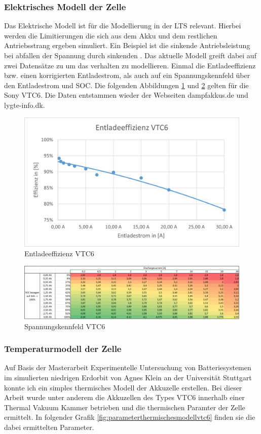 \subsubsection{Elektrisches Modell der Zelle}
Das Elektrische Modell ist für die Modellierung in der \ac{LTS} relevant. Hierbei werden die Limitierungen die sich aus dem Akku und dem restlichen Antriebsstrang ergeben simuliert. Ein Beispiel ist die sinkende Antriebsleistung bei abfallen der Spannung durch sinkenden . Das aktuelle Modell greift dabei auf zwei Datensätze zu um das verhalten zu modellieren. Einmal die Entladeeffizienz bzw. einen korrigierten Entladestrom, als auch auf ein Spannungskennfeld über den Entladestrom und \ac{SOC}. Die folgenden Abbildungen \ref{fig:Entladeeffizienz_VTC6} und \ref{fig:Spannung_ueber_SOC_Strom} gelten für die Sony VTC6. Die Daten entstammen wieder der Webseiten dampfakkus.de und lygte-info.dk.
\begin{figure}[h]
	\centering
	\includegraphics[width=0.7\linewidth]{bilder/Entladeeffizienz_VTC6}
	\caption{Entladeeffizienz VTC6}
	\label{fig:Entladeeffizienz_VTC6}
\end{figure}
\begin{figure}[h]
	\centering
	\includegraphics[width=0.7\linewidth]{bilder/Spannung_ueber_SOC_Strom}
	\caption{Spannungskennfeld VTC6}
	\label{fig:Spannung_ueber_SOC_Strom}
\end{figure}
\FloatBarrier
\subsubsection{Temperaturmodell der Zelle}
Auf Basis der Masterarbeit Experimentelle Untersuchung von Batteriesystemen im simulierten niedrigen Erdorbit von Agnes Klein an der Universität Stuttgart konnte ich ein simples thermisches Modell der Akkuzelle erstellen. Bei dieser Arbeit wurde unter anderem die Akkuzellen des Types VTC6 innerhalb einer Thermal Vakuum Kammer betrieben und die thermischen Paramter der Zelle ermittelt. In folgender Grafik \ref{fig:parameterthermischesmodellvtc6} finden sie die dabei ermittelten Parameter.

